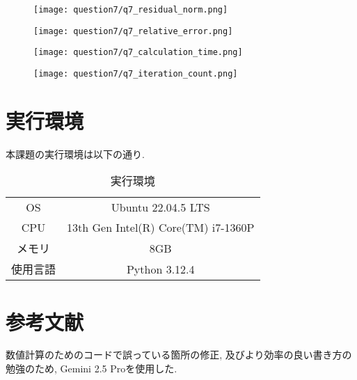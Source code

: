 \documentclass[uplatex,a4j]{jsarticle}
\begin{document}
\begin{figure}[htbp]
  \centering

  \begin{minipage}[t]{0.48\textwidth}
    \centering
    \texttt{[image: question7/q7\_residual\_norm.png]}
    \label{fig:q7_rn}
  \end{minipage}
  \hfill
  \begin{minipage}[t]{0.48\textwidth}
    \centering
    \texttt{[image: question7/q7\_relative\_error.png]}
    \label{fig:q7_re}
  \end{minipage}
  
\end{figure}

\begin{figure}[htbp]
  \centering

  \begin{minipage}[t]{0.48\textwidth}
    \centering
    \texttt{[image: question7/q7\_calculation\_time.png]}
    \label{fig:q7_ct}
  \end{minipage}
  \hfill
  \begin{minipage}[t]{0.48\textwidth}
    \centering
    \texttt{[image: question7/q7\_iteration\_count.png]}
    \label{fig:q7_ic}
  \end{minipage}
  
\end{figure}

\newpage
\section{実行環境}
\label{sec:env}
本課題の実行環境は以下の通り.

\begin{table}[ht]
  \centering
  \caption{実行環境}
  \label{tab:num}
  \begin{tabular}[ht]{c c}
    \hline
    OS & Ubuntu 22.04.5 LTS \\
    CPU & 13th Gen Intel(R) Core(TM) i7-1360P \\
    メモリ & 8GB \\
    使用言語 & Python 3.12.4 \\
    \hline
  \end{tabular}
\end{table}

\section{参考文献}
\label{sec:ref}
数値計算のためのコードで誤っている箇所の修正, 及びより効率の良い書き方の勉強のため, 
Gemini 2.5 Proを使用した.
\end{document}
